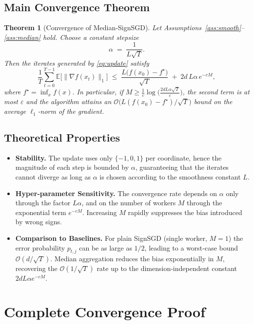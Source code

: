 \documentclass{article}
\newtheorem{theorem}{Theorem}
\newcommand{\E}{\mathbb{E}}
\begin{document}
\subsection*{Main Convergence Theorem}
\begin{theorem}[Convergence of Median‑SignSGD]\label{thm:main}
Let Assumptions~\ref{ass:smooth}–\ref{ass:median} hold.  
Choose a constant stepsize 
\[
\alpha\;=\;\frac{1}{L\sqrt{T}}.
\]
Then the iterates generated by \eqref{eq:update} satisfy
\[
\frac{1}{T}\sum_{t=0}^{T-1}\E\big[\|\nabla f(x_{t})\|_{1}\big]
\;\le\;
\frac{L\big(f(x_{0})-f^{\star}\big)}{\sqrt{T}}
   \;+\;2d\,L\alpha\,e^{-cM},
\tag{1}
\]
where $f^{\star}=\inf_{x}f(x)$.  
In particular, if $M\ge\frac{1}{c}\log\!\big(\frac{2dL\alpha\sqrt{T}}{\varepsilon}\big)$,
the second term is at most $\varepsilon$ and the algorithm attains an
$\mathcal{O}\!\big(L(f(x_{0})-f^{\star})/\sqrt{T}\big)$ bound on the average
$\ell_{1}$‑norm of the gradient.
\end{theorem}

\subsection*{Theoretical Properties}
\begin{itemize}[leftmargin=*]
\item \textbf{Stability.} The update uses only $\{-1,0,1\}$ per coordinate,
hence the magnitude of each step is bounded by $\alpha$, guaranteeing that
the iterates cannot diverge as long as $\alpha$ is chosen according to the
smoothness constant $L$.
\item \textbf{Hyper‑parameter Sensitivity.} The convergence rate depends on
$\alpha$ only through the factor $L\alpha$, and on the number of workers $M$
through the exponential term $e^{-cM}$.  Increasing $M$ rapidly suppresses
the bias introduced by wrong signs.
\item \textbf{Comparison to Baselines.} For plain SignSGD (single worker,
$M=1$) the error probability $p_{t,j}$ can be as large as $1/2$, leading to a
worst‑case bound $\mathcal{O}(d/\sqrt{T})$.  Median aggregation reduces the
bias exponentially in $M$, recovering the $\mathcal{O}(1/\sqrt{T})$ rate
up to the dimension‑independent constant $2dL\alpha e^{-cM}$.
\end{itemize}

\section*{Complete Convergence Proof}
\end{document}
